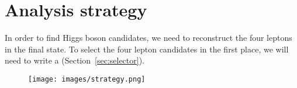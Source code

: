 \section{Analysis strategy}

In order to find Higgs boson candidates, we need to reconstruct the four leptons in the final state. To select the four lepton candidates in the first place, we will need to write a  (Section~\ref{sec:selector}).


\begin{figure}[!h]
    \centering
    \texttt{[image: images/strategy.png]}
\end{figure}
